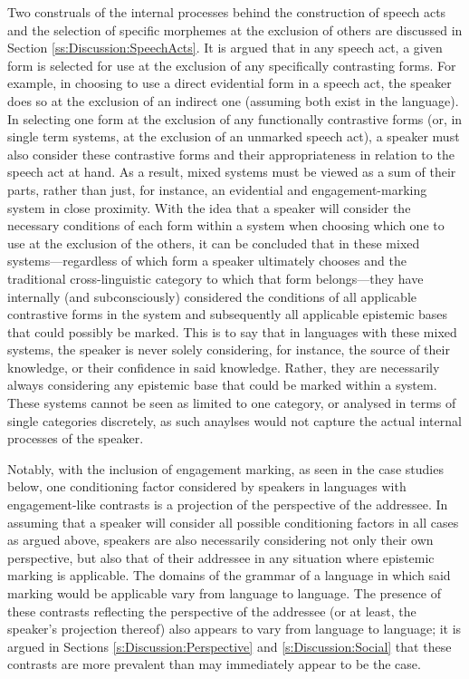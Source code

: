 Two construals of the internal processes behind the construction of speech acts and the selection of specific morphemes at the exclusion of others are discussed in Section \ref{ss:Discussion:SpeechActs}. It is argued that in any speech act, a given form is selected for use at the exclusion of any specifically contrasting forms. For example, in choosing to use a direct evidential form in a speech act, the speaker does so at the exclusion of an indirect one (assuming both exist in the language). In selecting one form at the exclusion of any functionally contrastive forms (or, in single term systems, at the exclusion of an unmarked speech act), a speaker must also consider these contrastive forms and their appropriateness in relation to the speech act at hand. As a result, mixed systems must be viewed as a sum of their parts, rather than just, for instance, an evidential and engagement-marking system in close proximity. With the idea that a speaker will consider the necessary conditions of each form within a system when choosing which one to use at the exclusion of the others, it can be concluded that in these mixed systems---regardless of which form a speaker ultimately chooses and the traditional cross-linguistic category to which that form belongs---they have internally (and subconsciously) considered the conditions of all applicable contrastive forms in the system and subsequently all applicable epistemic bases that could possibly be marked. This is to say that in languages with these mixed systems, the speaker is never solely considering, for instance, the source of their knowledge, or their confidence in said knowledge. Rather, they are necessarily always considering any epistemic base that could be marked within a system. These systems cannot be seen as limited to one category, or analysed in terms of single categories discretely, as such anaylses would not capture the actual internal processes of the speaker.

Notably, with the inclusion of engagement marking, as seen in the case studies below, one conditioning factor considered by speakers in languages with engagement-like contrasts is a projection of the perspective of the addressee. In assuming that a speaker will consider all possible conditioning factors in all cases as argued above, speakers are also necessarily considering not only their own perspective, but also that of their addressee in any situation where epistemic marking is applicable. The domains of the grammar of a language in which said marking would be applicable vary from language to language. The presence of these contrasts reflecting the perspective of the addressee (or at least, the speaker's projection thereof) also appears to vary from language to language; it is argued in Sections \ref{s:Discussion:Perspective} and \ref{s:Discussion:Social} that these contrasts are more prevalent than may immediately appear to be the case.

